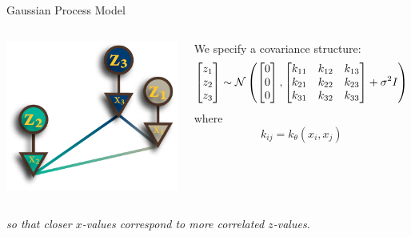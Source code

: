 \documentclass[aspectratio=169,19pt,xetex,handout]{beamer}
\begin{document}
\begin{frame}{Gaussian Process Model}
\Large

\begin{columns}[T] %
\includegraphics[width=\textwidth]{gp_model}

We specify a covariance structure:
\[
\begin{bmatrix} z_1 \\ z_2 \\ z_3 \end{bmatrix} 
\sim \mathcal{N}\left(\begin{bmatrix} 0 \\ 0 \\ 0 \end{bmatrix}, \begin{bmatrix} k_{11} & k_{12} & k_{13} \\ k_{21} & k_{22} & k_{23} \\ k_{31} & k_{32} & k_{33} \end{bmatrix} + \sigma^2 I \right)
\]
where
\[
k_{ij} = k_\theta(x_i,x_j)
\]
\end{columns}

\vspace{10pt}
\emph{so that closer $x$-values correspond to more correlated $z$-values.}

\end{frame}
\end{document}

